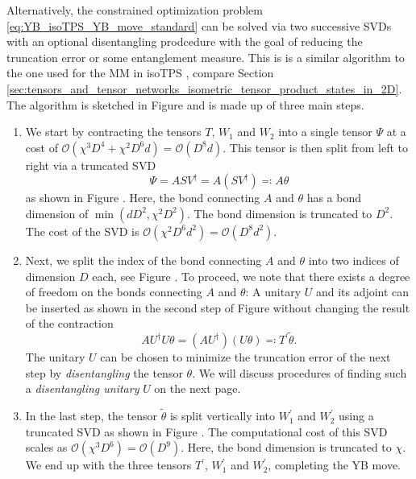 Alternatively, the constrained optimization problem \eqref{eq:YB_isoTPS_YB_move_standard} can be solved via two successive SVDs with an optional disentangling prodcedure with the goal of reducing the truncation error or some entanglement measure. This is is a similar algorithm to the one used for the MM in isoTPS \cite{cite:efficient_simulation_of_dynamics_in_two_dimensional_quantum_spin_systems}, compare Section \ref{sec:tensors_and_tensor_networks_isometric_tensor_product_states_in_2D}. The algorithm is sketched in Figure  and is made up of three main steps.
\begin{enumerate}
	\item We start by contracting the tensors $T$, $W_1$ and $W_2$ into a single tensor $\Psi$ at a cost of $\mathcal{O}(\chi^3D^4+\chi^2D^6d) = \mathcal{O}(D^8d)$. This tensor is then split from left to right via a truncated SVD
	\begin{equation}
		\Psi = ASV^\dagger = A(SV^\dagger) \eqqcolon A\theta
	\end{equation}
	as shown in Figure . Here, the bond connecting $A$ and $\theta$ has a bond dimension of $\min(dD^2, \chi^2D^2)$. The bond dimension is truncated to $D^2$. The cost of the SVD is $\mathcal{O}(\chi^2D^6d^2) = \mathcal{O}(D^8d^2)$.
	\item Next, we split the index of the bond connecting $A$ and $\theta$ into two indices of dimension $D$ each, see Figure . To proceed, we note that there exists a degree of freedom on the bonds connecting $A$ and $\theta$: A unitary $U$ and its adjoint can be inserted as shown in the second step of Figure  without changing the result of the contraction
	\begin{equation}
		AU^\dagger U\theta = (AU^\dagger)(U\theta) \eqqcolon T^\prime \tilde{\theta}.
	\end{equation}
	The unitary $U$ can be chosen to minimize the truncation error of the next step by \textit{disentangling} the tensor $\theta$. We will discuss procedures of finding such a \textit{disentangling unitary} $U$ on the next page.
	\item In the last step, the tensor $\tilde{\theta}$ is split vertically into $W_1^\prime$ and $W_2^\prime$ using a truncated SVD as shown in Figure . The computational cost of this SVD scales as $\mathcal{O}(\chi^3D^6) = \mathcal{O}(D^9)$. Here, the bond dimension is truncated to $\chi$. We end up with the three tensors $T^\prime$, $W_1^\prime$ and $W_2^\prime$, completing the YB move.
\end{enumerate}
